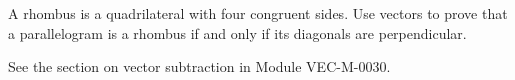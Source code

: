\documentclass{ximera}
\begin{document}
\begin{problem} A rhombus is a quadrilateral with four congruent sides.  Use vectors to prove that a parallelogram is a rhombus if and only if its diagonals are perpendicular.
\begin{hint}
See the section on vector subtraction in Module VEC-M-0030.
\end{hint}
\end{problem}


\end{document}
